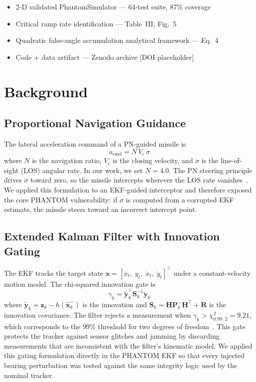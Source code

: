 \documentclass[journal]{IEEEtran}
\begin{document}
\begin{itemize}
\item 2-D validated PhantomSimulator --- 64-test suite, 87\% coverage
\item Critical ramp rate identification --- Table~III, Fig.~5
\item Quadratic false-angle accumulation analytical framework --- Eq.~4
\item Code + data artifact --- Zenodo archive [DOI placeholder]
\end{itemize}

\section{Background}
\label{sec:background}

\subsection{Proportional Navigation Guidance}
The lateral acceleration command of a PN-guided missile is
\begin{equation}
  a_{\text{cmd}} = N\, V_c\, \dot{\sigma}
  \label{eq:pn}
\end{equation}
where $N$ is the navigation ratio, $V_c$ is the closing velocity,
and $\dot{\sigma}$ is the line-of-sight (LOS) angular rate.  In our
work, we set $N = 4.0$.  The PN steering principle drives
$\dot{\sigma}$ toward zero, so the missile intercepts wherever the
LOS rate vanishes~\cite{zarchan2012}.  We applied this formulation to
an EKF-guided interceptor and therefore exposed the core PHANTOM
vulnerability: if $\dot{\sigma}$ is computed from a corrupted EKF
estimate, the missile steers toward an incorrect intercept point.

\subsection{Extended Kalman Filter with Innovation Gating}
The EKF tracks the target state
$\mathbf{x} = [x_t,\; y_t,\; \dot{x}_t,\; \dot{y}_t]^\top$
under a constant-velocity motion model.  The chi-squared innovation
gate is
\begin{equation}
  \gamma_k
  = \tilde{\mathbf{y}}_k^\top \mathbf{S}_k^{-1}
    \tilde{\mathbf{y}}_k
  \label{eq:gate}
\end{equation}
where $\tilde{\mathbf{y}}_k = \mathbf{z}_k - h(\hat{\mathbf{x}}_k^-)$
is the innovation and
$\mathbf{S}_k = \mathbf{H}\mathbf{P}_k^-\mathbf{H}^\top + \mathbf{R}$
is the innovation covariance.  The filter rejects a measurement when
$\gamma_k > \chi^2_{0.99,\,2} = 9.21$, which corresponds to the
$99\%$ threshold for two degrees of freedom~\cite{barshalom2001}.
This gate protects the tracker against sensor glitches and jamming by
discarding measurements that are inconsistent with the filter's
kinematic model.  We applied this gating formulation directly in the
PHANTOM EKF so that every injected bearing perturbation was tested
against the same integrity logic used by the nominal tracker.
\end{document}
